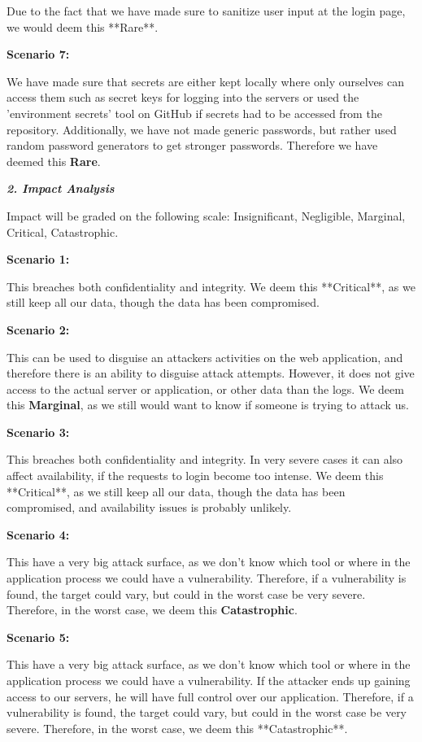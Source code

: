 Due to the fact that we have made sure to sanitize user input at the login page, we would deem this **Rare**.

\textbf{Scenario 7:}

We have made sure that secrets are either kept locally where only ourselves can access them such as secret keys for logging into the servers or used the 'environment secrets' tool on GitHub if secrets had to be accessed from the repository. Additionally, we have not made generic passwords, but rather used random password generators to get stronger passwords. Therefore we have deemed this \textbf{Rare}.

\textit{\textbf{2. Impact Analysis}}

Impact will be graded on the following scale: {Insignificant, Negligible, Marginal, Critical, Catastrophic}.

\textbf{Scenario 1:}

This breaches both confidentiality and integrity. We deem this **Critical**, as we still keep all our data, though the data has been compromised.

\textbf{Scenario 2:}

This can be used to disguise an attackers activities on the web application, and therefore there is an ability to disguise attack attempts. However, it does not give access to the actual server or application, or other data than the logs. We deem this \textbf{Marginal}, as we still would want to know if someone is trying to attack us.

\textbf{Scenario 3:}

This breaches both confidentiality and integrity. In very severe cases it can also affect availability, if the requests to login become too intense. We deem this **Critical**, as we still keep all our data, though the data has been compromised, and availability issues is probably unlikely.

\textbf{Scenario 4:}

This have a very big attack surface, as we don't know which tool or where in the application process we could have a vulnerability. Therefore, if a vulnerability is found, the target could vary, but could in the worst case be very severe. Therefore, in the worst case, we deem this \textbf{Catastrophic}.

\textbf{Scenario 5:}

This have a very big attack surface, as we don't know which tool or where in the application process we could have a vulnerability. If the attacker ends up gaining access to our servers, he will have full control over our application. Therefore, if a vulnerability is found, the target could vary, but could in the worst case be very severe. Therefore, in the worst case, we deem this **Catastrophic**.

